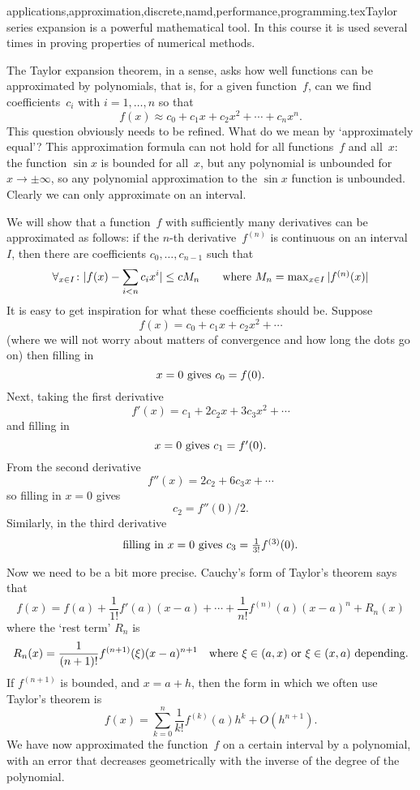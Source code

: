 {applications,approximation,discrete,namd,performance,programming}.texTaylor series expansion is a powerful mathematical tool. In this
course it is used several times in proving properties of numerical
methods.

The Taylor expansion theorem, in a sense, asks how well functions can
be approximated by polynomials, that is, for a given
function~$f$, can we find coefficients~$c_i$ with $i=1,\ldots,n$ so that
\[ f(x)\approx c_0+c_1x+c_2x^2+\cdots+c_nx^n.\]
This question obviously needs to be refined. What do we mean by
`approximately equal'? This approximation formula can not
hold for all functions~$f$ and all~$x$: the function $\sin x$ is
bounded for all~$x$, but any polynomial is unbounded for $x\rightarrow
\pm\infty$, so any polynomial approximation to the $\sin x$ function
is unbounded. Clearly we can only approximate on an interval.

We will show that a function~$f$ with sufficiently many derivatives
can be approximated as follows: if the $n$-th derivative~$f^{(n)}$ is
continuous on an interval~$I$, then there are coefficients
$c_0,\ldots,c_{n-1}$ such that
\[
  \forall_{x\in I}\colon |f(x)-\sum_{i<n}c_ix^i|\leq cM_n
    \qquad\hbox{where $M_n=\max_{x\in I}|f^{(n)}(x)|$}
\]
It is easy to get inspiration for what these coefficients should
be. Suppose
\[ f(x) = c_0+c_1x+c_2x^2+\cdots \]
(where we will not worry about matters of convergence and how long the
dots go on) then filling in
\[ \hbox{$x=0$ gives $c_0=f(0)$.} \]
Next, taking the first derivative 
\[ f'(x) = c_1+2c_2x+3c_3x^2+\cdots \]
and filling in
\[ \hbox{$x=0$ gives $c_1=f'(0)$.} \]
From the second derivative
\[ f''(x) = 2c_2+6c_3x+\cdots \]
so filling in $x=0$ gives
\[ c_2=f''(0)/2. \]
Similarly, in the third derivative
\[ \hbox{filling in $x=0$ gives $c_3=\frac1{3!}f^{(3)}(0)$.} \]

Now we need to be a bit more precise. Cauchy's form of Taylor's
theorem says that
\[ f(x) = 
    f(a)+\frac1{1!}f'(a)(x-a)+\cdots+\frac1{n!}f^{(n)}(a)(x-a)^n
    +R_n(x)
\]
where the `rest term' $R_n$ is 
\[ R_n(x) = \frac1{(n+1)!}f^{(n+1)}(\xi)(x-a)^{n+1}
    \quad\hbox{where $\xi\in(a,x)$ or $\xi\in(x,a)$ depending.}
\]
If $f^{(n+1)}$ is bounded, and $x=a+h$, then the form in which we
often use
Taylor's theorem is 
\[ f(x) = \sum_{k=0}^n \frac1{k!}f^{(k)}(a)h^k+O(h^{n+1}).\]
We have now approximated the function~$f$ on a certain interval by a
polynomial, with an error that decreases geometrically with the
inverse of the degree of the polynomial.

